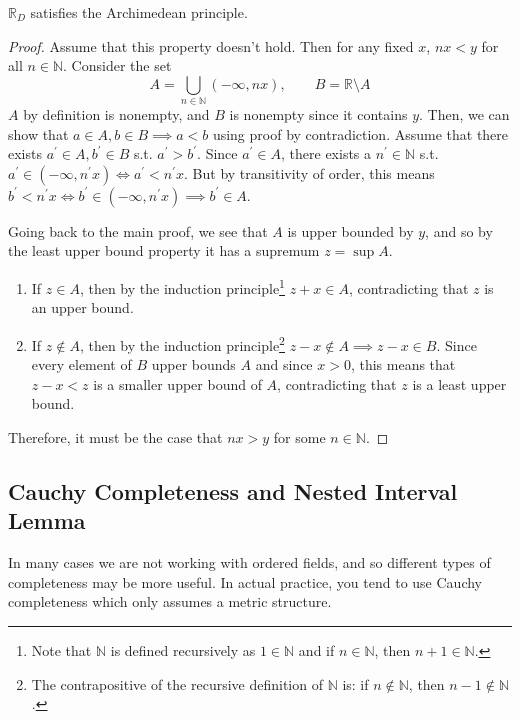   \begin{theorem}
    $\mathbb{R}_D$ satisfies the Archimedean principle. 
  \end{theorem}
  \begin{proof}
    Assume that this property doesn't hold. Then for any fixed $x$, $nx < y$ for all $n \in \mathbb{N}$. Consider the set 
    \begin{equation}
      A = \bigcup_{n \in \mathbb{N}} (-\infty, nx), \qquad B = \mathbb{R} \setminus A
    \end{equation}
    $A$ by definition is nonempty, and $B$ is nonempty since it contains $y$. Then, we can show that $a \in A, b \in B \implies a < b$ using proof by contradiction. Assume that there exists $a^\prime \in A, b^\prime \in B$ s.t. $a^\prime > b^\prime$. Since $a^\prime \in A$, there exists a $n^\prime \in \mathbb{N}$ s.t. $a^\prime \in (-\infty, n^\prime x) \iff a^\prime < n^\prime x$. But by transitivity of order, this means $b^\prime < n^\prime x \iff b^\prime \in (-\infty, n^\prime x) \implies b^\prime \in A$. 

    Going back to the main proof, we see that $A$ is upper bounded by $y$, and so by the least upper bound property it has a supremum $z = \sup{A}$. 
    \begin{enumerate}
      \item If $z \in A$, then by the induction principle\footnote{Note that $\mathbb{N}$ is defined recursively as $1 \in \mathbb{N}$ and if $n \in \mathbb{N}$, then $n+1 \in \mathbb{N}$. } $z + x \in A$, contradicting that $z$ is an upper bound. 
      \item If $z \not\in A$, then by the induction principle\footnote{The contrapositive of the recursive definition of $\mathbb{N}$ is: if $n \not\in \mathbb{N}$, then $n-1 \not\in \mathbb{N}$.} $z-x \not\in A \implies z-x \in B$. Since every element of $B$ upper bounds $A$ and since $x > 0$, this means that $z-x < z$ is a smaller upper bound of $A$, contradicting that $z$ is a least upper bound. 
    \end{enumerate}
    Therefore, it must be the case that $nx > y$ for some $n \in \mathbb{N}$. 
  \end{proof}

\subsection{Cauchy Completeness and Nested Interval Lemma} 

  In many cases we are not working with ordered fields, and so different types of completeness may be more useful. In actual practice, you tend to use Cauchy completeness which only assumes a metric structure. 

